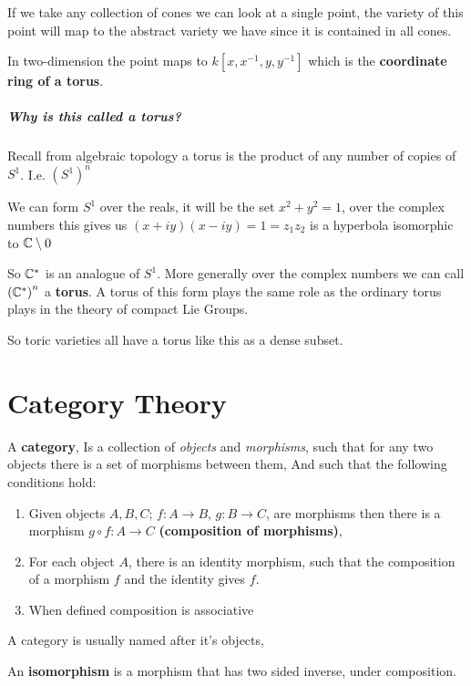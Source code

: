 If we take any collection of cones we can look at a single point, the variety of this point will map to the abstract variety we have since it is contained in all cones.

In two-dimension the point maps to $k[x,x^{-1},y,y^{-1}]$ which is the \textbf{coordinate ring of a torus}.

\subparagraph*{Why is this called a torus?}

Recall from algebraic topology a torus is the product of any number of copies of $S^1$. I.e. ${(S^1)}^n$

We can form $S^1$ over the reals, it will be the set $x^2 + y^2 = 1$, over the complex numbers this gives us $(x+iy)(x-iy) = 1 = z_1z_2$ is a hyperbola isomorphic to $\mathbb{C}\setminus 0$ 

So $\mathbb{C}^\ast$ is an analogue of $S^1$. More generally over the complex numbers we can call ${(\mathbb{C}^\ast)}^n$ a \textbf{torus}. A torus of this form plays the same role as the ordinary torus plays in the theory of compact Lie Groups.

So toric varieties all have a torus like this as a dense subset.


\section{Category Theory}

\begin{definition}
    A \textbf{category}, Is a collection of \textit{objects} and \textit{morphisms}, such that for any two objects there is a set of morphisms between them,
    And such that the following conditions hold:\begin{enumerate}
        \item Given objects $A,B,C$; $f\colon A\rightarrow B$, $g\colon B\rightarrow C$, are morphisms then there is a morphism $g\circ f\colon A\rightarrow C$ \textbf{(composition of morphisms)},
        \item For each object $A$, there is an identity morphism, such that the composition of a morphism $f$ and the identity gives $f$.
        \item  When defined composition is associative
    \end{enumerate}   

    A category is usually named after it's objects,
\end{definition}

\begin{definition}
    An \textbf{isomorphism} is a morphism that has two sided inverse, under composition.
\end{definition}

